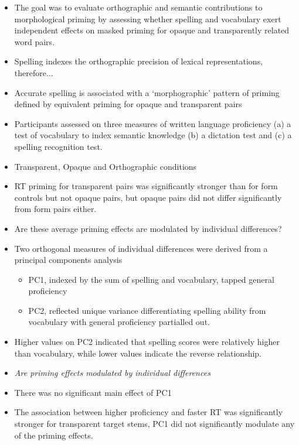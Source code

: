 \documentclass[]{article}
\begin{document}
{\begin{itemize}
			\item The goal was to evaluate orthographic and semantic contributions to morphological priming by assessing whether spelling and vocabulary exert independent effects on masked priming for opaque and transparently related word pairs.
			\item Spelling indexes the orthographic precision of lexical representations, therefore...
			\item Accurate spelling is associated with a ‘morphographic’ pattern of priming defined by equivalent priming for opaque and transparent pairs
		\end{itemize}

		\begin{itemize}
			\item Participants  assessed on three measures of written language proficiency (a) a test of vocabulary to index semantic knowledge (b) a dictation test and (c) a spelling recognition test.
			\item Transparent, Opaque and Orthographic conditions
			\item RT priming for transparent pairs was significantly stronger than for form controls but not opaque pairs, but opaque pairs did not differ significantly from form pairs either.
			\item Are these average priming effects are modulated by individual differences?
			\item  Two orthogonal measures of individual differences were derived from a principal components analysis
			\begin{itemize}
				\item PC1, indexed by the sum of spelling and vocabulary, tapped general proficiency
				\item PC2,  reflected unique variance differentiating spelling ability from vocabulary with general proficiency partialled out.
			\end{itemize}
			\item 	Higher values on PC2 indicated that spelling scores were relatively higher than vocabulary, while lower values indicate the reverse relationship.
			\item \textit{Are priming effects modulated by individual differences}
			\item  There was no significant main effect of PC1
			\item The association between higher proficiency and faster RT was significantly stronger for transparent target stems,  PC1 did not significantly modulate any of the priming effects.

\end{itemize}}
\end{document}
